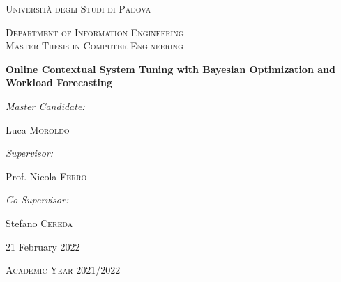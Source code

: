 \documentclass[a4paper, 12pt]{article} %
\begin{document}
	
	\begin{titlepage}
		\centering
		\vspace*{1cm}
		{\par \scshape\LARGE Università degli Studi di Padova \par}
		\vspace{1cm}
		{\scshape\Large Department of Information Engineering\\Master Thesis in Computer Engineering\par}
		\vspace{1.5cm}
		{\huge\bfseries Online Contextual System Tuning with Bayesian Optimization and Workload Forecasting\par}
		\vspace{2cm}
		{ \large \itshape Master Candidate:}
		{ \large Luca \textsc{Moroldo} \par}
		\vspace{0.7cm}
		{ \large \itshape Supervisor:}
		{ \large Prof. Nicola \textsc{Ferro} \par}
		{ \large \itshape Co-Supervisor:}
		{ \large Stefano \textsc{Cereda} \par}
		\vfill
		
		{ \large 21 February 2022 \par}
		{ \large \textsc{Academic Year 2021/2022}\par}
	\end{titlepage}
	
	\clearpage%
	\thispagestyle{empty}%
	\addtocounter{page}{-1}%
	\null%
	\clearpage
	
	\newpage
	
\end{document}
